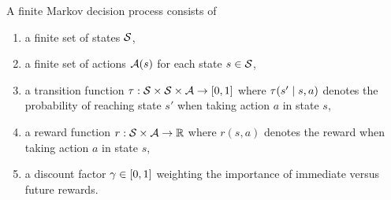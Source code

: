\begin{definition}
\label{def: mdp}
A finite Markov decision process consists of
\vspace{-0.3cm}
\begin{enumerate}
    \item a finite set of states $\mathcal{S}$,
    
    \item a finite set of actions $\mathcal{A}(s)$ for each state $s \in \mathcal{S}$,
    
    \item a transition function $\tau : \mathcal{S} \times \mathcal{S} \times \mathcal{A} \to [0,1]$ where
    $\tau(s' \mid s, a)$ denotes the probability of reaching state $s'$ when taking action $a$ in state $s$,
    
    \item a reward function $r : \mathcal{S} \times \mathcal{A} \to \mathbb{R}$ where $r(s,a)$ denotes the reward 
    when taking action $a$ in state $s$,

    \item a discount factor $\gamma \in [0,1]$ weighting the importance of immediate versus future rewards.
\end{enumerate}
\end{definition}